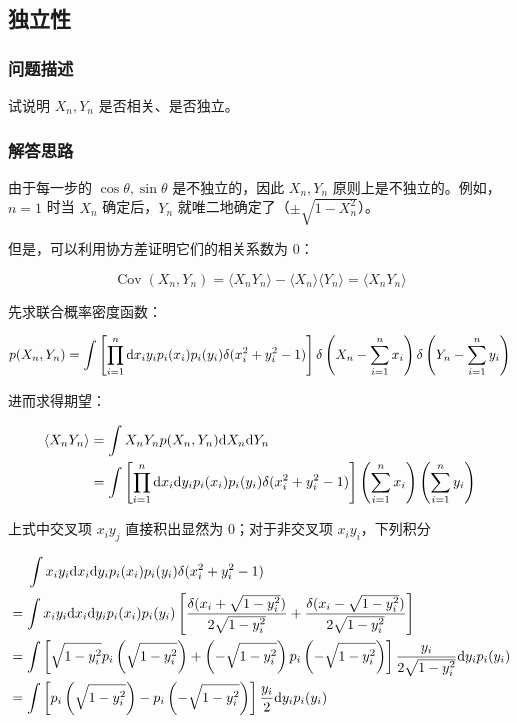 \documentclass{ctexart}
\begin{document}
\subsection{独立性}
\subsubsection{问题描述}
试说明 $X_n,Y_n$ 是否相关、是否独立。
\subsubsection{解答思路}

由于每一步的 $\cos\theta, \sin\theta$ 是不独立的，因此 $X_n,Y_n$ 原则上是不独立的。例如，$n=1$ 时当 $X_n$ 确定后，$Y_n$ 就唯二地确定了（$\pm\sqrt{1-X_n^2}$）。

但是，可以利用协方差证明它们的相关系数为 0：

$$
\operatorname{Cov}\left(X_{n}, Y_{n}\right)=\langle X_{n} Y_{n}\rangle-\langle X_{n}\rangle \langle Y_{n}\rangle=\langle X_{n} Y_{n}\rangle
$$

先求联合概率密度函数：

\[
p(X_n,Y_n)=\int \left[\prod_{i=1}^n \mathrm{d} x_{i}y_i p_i(x_i)p_i(y_i)\delta(x_i^2+y_i^2-1)\right] \delta\left(X_n-\sum_{i=1}^{n} x_{i}\right)\delta\left(Y_n-\sum_{i=1}^{n} y_{i}\right)
\]

进而求得期望：

\begin{align*}
\langle X_nY_n\rangle
&=\int X_nY_n p(X_n,Y_n)\mathrm{d} X_n\mathrm{d} Y_n
\\
&=\int\left[ \prod_{i=1}^n \mathrm{d} x_{i}\mathrm{d} y_i p_i(x_i)p_i(y_i)\delta(x_i^2+y_i^2-1)\right] \left(\sum_{i=1}^{n} x_{i}\right)\left(\sum_{i=1}^{n} y_{i}\right)
\end{align*}

上式中交叉项 $x_iy_j$ 直接积出显然为 0；对于非交叉项 $x_iy_i$，下列积分

\begin{align*}
&~~~~\int x_iy_i \mathrm{d} x_i \mathrm{d} y_i p_i(x_i) p_i(y_i)\delta(x_i^2+y_i^2-1)
\\
&=\int x_iy_i \mathrm{d} x_i \mathrm{d} y_i p_i(x_i) p_i(y_i)\left[\frac{\delta(x_i+\sqrt{1-y_i^2})}{2\sqrt{1-y_i^2}}+\frac{\delta(x_i-\sqrt{1-y_i^2})}{2\sqrt{1-y_i^2}}\right]
\\
&=\int \left[\sqrt{1-y_i^2}p_i\left(\sqrt{1-y_i^2}\right)+\left(-\sqrt{1-y_i^2}\right)p_i\left(-\sqrt{1-y_i^2}\right)\right] \frac{y_i}{2\sqrt{1-y_i^2}} \mathrm{d} y_i p_i(y_i)
\\
&=\int \left[p_i\left(\sqrt{1-y_i^2}\right)-p_i\left(-\sqrt{1-y_i^2}\right)\right] \frac{y_i}{2} \mathrm{d} y_i p_i(y_i)
\end{align*}
\end{document}
